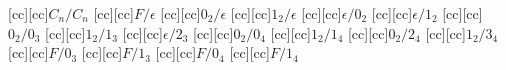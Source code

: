 [cc][cc]{$C_n/C_n$}
[cc][cc]{$F/\epsilon$}
[cc][cc]{$0_2/\epsilon$}
[cc][cc]{$1_2/\epsilon$}
[cc][cc]{$\epsilon/0_2$}
[cc][cc]{$\epsilon/1_2$}
[cc][cc]{$0_2/0_3$}
[cc][cc]{$1_2/1_3$}
[cc][cc]{$\epsilon/2_3$}
[cc][cc]{$0_2/0_4$}
[cc][cc]{$1_2/1_4$}
[cc][cc]{$0_2/2_4$}
[cc][cc]{$1_2/3_4$}
[cc][cc]{$F/0_3$}
[cc][cc]{$F/1_3$}
[cc][cc]{$F/0_4$}
[cc][cc]{$F/1_4$}
